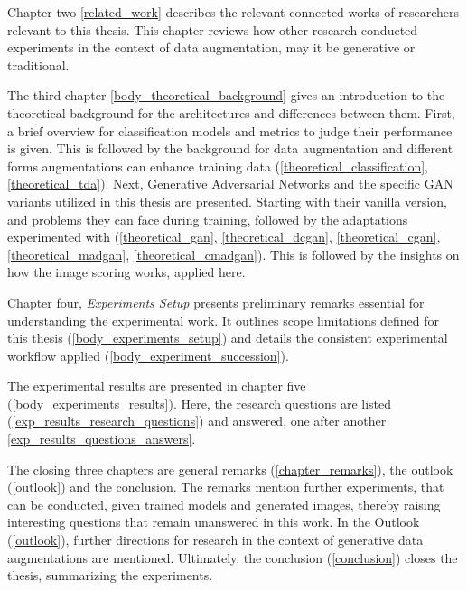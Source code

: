\newpage

Chapter two \ref{related_work} describes the relevant connected works of researchers relevant to this thesis. This chapter reviews how other research conducted experiments in the context of data augmentation, may it be generative or traditional.

The third chapter \ref{body_theoretical_background} gives an introduction to the theoretical background for the architectures and differences between them. First, a brief overview for classification models and metrics to judge their performance is given. This is followed by the background for data augmentation and different forms augmentations can enhance training data (\ref{theoretical_classification}, \ref{theoretical_tda}). Next, Generative Adversarial Networks and the specific GAN variants utilized in this thesis are presented. Starting with their vanilla version, and problems they can face during training, followed by the adaptations experimented with (\ref{theoretical_gan}, \ref{theoretical_dcgan}, \ref{theoretical_cgan}, \ref{theoretical_madgan}, \ref{theoretical_cmadgan}). This is followed by the insights on how the image scoring works, applied here.

Chapter four, \textit{Experiments Setup} presents preliminary remarks essential for understanding the experimental work. It outlines scope limitations defined for this thesis (\ref{body_experiments_setup}) and details the consistent experimental workflow applied (\ref{body_experiment_succession}).

The experimental results are presented in chapter five (\ref{body_experiments_results}). Here, the research questions are listed (\ref{exp_results_research_questions}) and answered, one after another \ref{exp_results_questions_answers}.

The closing three chapters are general remarks (\ref{chapter_remarks}), the outlook (\ref{outlook}) and the conclusion. The remarks mention further experiments, that can be conducted, given trained models and generated images, thereby raising interesting questions that remain unanswered in this work. In the Outlook (\ref{outlook}), further directions for research in the context of generative data augmentations are mentioned. Ultimately, the conclusion (\ref{conclusion}) closes the thesis, summarizing the experiments.

\newpage
